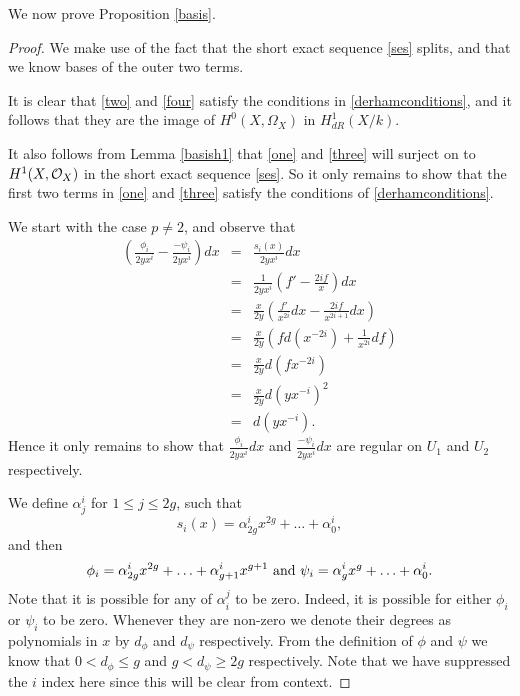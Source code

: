 \documentclass[draft, 11pt]{article} %
\theoremstyle{plain}
\theoremstyle{remark}
\newcommand{\cO}{{\cal O}}
\begin{document}

We now prove Proposition \ref{basis}.

\begin{proof}
We make use of the fact that the short exact sequence \eqref{ses} splits, and that we know bases of the outer two terms.

It is clear that \eqref{two} and \eqref{four} satisfy the conditions in \eqref{derhamconditions}, and it follows \cite[Thm 6.1]{faithfulaction} that they are the image of $H^0(X,\Omega_X)$ in $H^1_{dR}(X/k)$.

It also follows from Lemma \ref{basish1} that \eqref{one} and \eqref{three} will surject on to $H^1(X,\cO_X)$ in the short exact sequence \eqref{ses}. 
So it only remains to show that the first two terms in \eqref{one} and \eqref{three} satisfy the conditions of \eqref{derhamconditions}.


We start with the case $p\neq 2$, and observe that
\begin{eqnarray*}
\left( \frac{\phi_i}{2yx^i} - \frac{-\psi_i}{2yx^i} \right) dx & = & \frac{s_i(x)}{2yx^i} dx \\
& = & \frac{1}{2yx^i} \left( f' - \frac{2if}{x} \right) dx \\
& = & \frac{x}{2y} \left( \frac{f'}{x^{2i}}dx -\frac{2if}{x^{2i+1}} dx \right) \\
& = & \frac{x}{2y} \left( fd(x^{-2i}) + \frac{1}{x^{2i}}df \right) \\
& = & \frac{x}{2y}d(fx^{-2i}) \\
& = & \frac{x}{2y} d(yx^{-i})^2 \\
& = & d(yx^{-i}).
\end{eqnarray*}
Hence it only remains to show that $\frac{\phi_i}{2yx^i}dx$ and $\frac{-\psi_i}{2yx^i}dx$ are regular on $U_1$ and $U_2$ respectively.



We define $\alpha^i_j$ for $1\leq j \leq 2g$, such that
\[
s_i(x) = \alpha^i_{2g}x^{2g} + \ldots + \alpha^i_0,
\]
and then
\[
\phi_i = \alpha^i_{2g}x^{2g} + \ldots + \alpha^i_{g+1}x^{g+1} \ {\rm and } \ \psi_i = \alpha^i_gx^g + \ldots + \alpha^i_0.
\]
Note that it is possible for any of $\alpha_i^j$ to be zero. Indeed, it is possible for either $\phi_i$ or $\psi_i$ to be zero.
Whenever they are non-zero we denote their degrees as polynomials in $x$ by $d_\phi$ and $d_\psi$ respectively. From the definition of $\phi$ and $\psi$ we know that $0 < d_\phi \leq g$ and $g < d_\psi \geq 2g$ respectively.
Note that we have suppressed the $i$ index here since this will be clear from context.



\end{proof}
\end{document}
